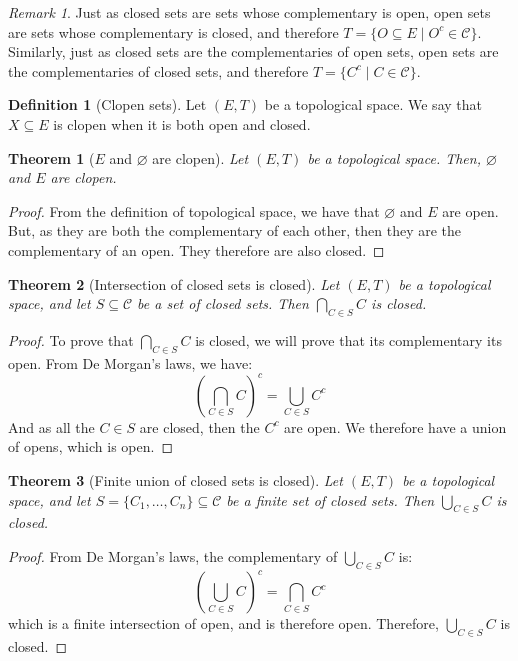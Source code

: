 \documentclass{article}
\newtheorem{theorem}{Theorem}[section]
\theoremstyle{definition}
\newtheorem{definition}{Definition}[section]
\theoremstyle{remark}
\newtheorem*{remark}{Remark}
\theoremstyle{example}
\theoremstyle{notation}
\newcommand{\closed}{\mathcal{C}}
\begin{document}
\begin{remark}
	Just as closed sets are sets whose complementary is open, open sets are sets whose complementary is closed, and therefore $T = \{O \subseteq E \mid O^c \in \closed\}$. Similarly, just as closed sets are the complementaries of open sets, open sets are the complementaries of closed sets, and therefore $T = \{C^c \mid C \in \closed\}$.
\end{remark}

\begin{definition}[Clopen sets]
		Let $(E, T)$ be a topological space. We say that $X \subseteq E$ is clopen when it is both open and closed.
\end{definition}

\begin{theorem}[$E$ and $\varnothing$ are clopen]
		Let $(E, T)$ be a topological space. Then, $\varnothing$ and $E$ are clopen.
\end{theorem}

\begin{proof}
		From the definition of topological space, we have that $\varnothing$ and $E$ are open. But, as they are both the complementary of each other, then they are the complementary of an open. They therefore are also closed.
\end{proof}

\begin{theorem}[Intersection of closed sets is closed]
		Let $(E, T)$ be a topological space, and let $S \subseteq \closed$ be a set of closed sets. Then $\bigcap_{C \in S} C$ is closed.
\end{theorem}

\begin{proof}
		To prove that $\bigcap_{C \in S} C$ is closed, we will prove that its complementary its open. From De Morgan's laws, we have:
				$$(\bigcap_{C \in S} C)^c = \bigcup_{C \in S} C^c$$
		And as all the $C \in S$ are closed, then the $C^c$ are open. We therefore have a union of opens, which is open.
\end{proof}

\begin{theorem}[Finite union of closed sets is closed]
		Let $(E, T)$ be a topological space, and let $S = \{C_1, \dots, C_n\} \subseteq \closed$ be a finite set of closed sets. Then $\bigcup_{C \in S} C$ is closed.
\end{theorem}

\begin{proof}
		From De Morgan's laws, the complementary of $\bigcup_{C \in S} C$ is:
				$$(\bigcup_{C \in S} C)^c = \bigcap_{C \in S} C^c$$
		which is a finite intersection of open, and is therefore open. Therefore, $\bigcup_{C \in S} C$ is closed.
\end{proof}
\end{document}
